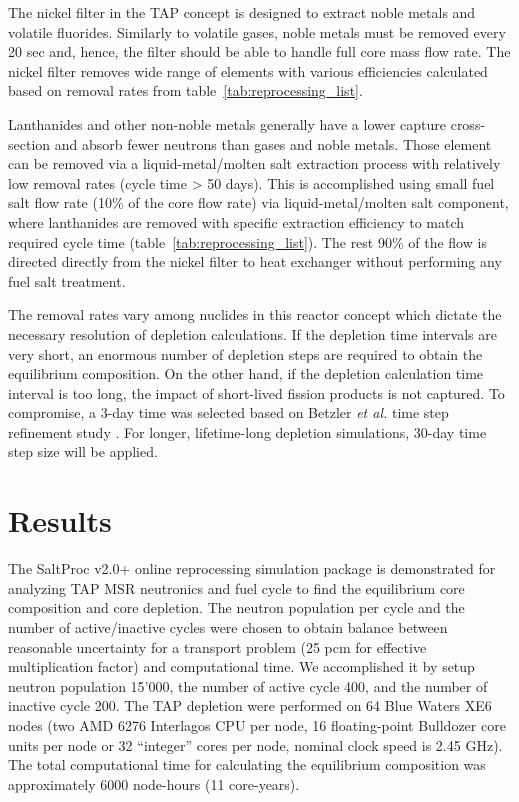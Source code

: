 \documentclass[12pt]{article} %
\begin{document}
The nickel filter in the \gls{TAP} concept is designed to extract noble metals and 
volatile fluorides. Similarly to volatile gases, noble metals must be removed 
every 20 sec and, hence, the filter should be able to handle full core mass 
flow rate. The nickel filter removes wide range of elements with various 
efficiencies calculated based on removal rates from table~\ref{tab:reprocessing_list}.

Lanthanides and other non-noble metals generally have a lower capture cross-section 
and absorb fewer neutrons than gases and noble metals. Those element can be removed 
via a liquid-metal/molten salt extraction process with relatively low removal rates 
(cycle time > 50 days). This is accomplished using small fuel salt flow rate (10\% 
of the core flow rate) via liquid-metal/molten salt component, where lanthanides are 
removed with specific extraction efficiency to match required cycle time (table~\ref{tab:reprocessing_list}). The rest 90\% of the flow is directed directly from the 
nickel filter to heat exchanger without performing any fuel salt treatment.

The removal rates vary among nuclides in this reactor concept which dictate the 
necessary resolution of depletion calculations. If the depletion time intervals 
are very short, an enormous number of depletion steps are required to obtain 
the equilibrium composition. On the other hand, if the depletion calculation time 
interval is too long, the impact of short-lived fission products is not captured. To compromise, a 3-day time was selected based on Betzler \emph{et al.} time step 
refinement study \cite{betzler_assessment_2017}. For longer, lifetime-long 
depletion simulations, 30-day time step size will be applied.

\section{Results}
The SaltProc v2.0+ online reprocessing simulation package is demonstrated for 
analyzing \gls{TAP} \gls{MSR} neutronics and fuel cycle to find the equilibrium core composition and core depletion. The neutron population per cycle and the number 
of active/inactive cycles were chosen to obtain balance between reasonable 
uncertainty for a transport problem (25 pcm for effective multiplication factor) 
and computational time. We accomplished it by setup neutron population 15'000, 
the number of active cycle 400, and the number of inactive cycle 200. 
The \gls{TAP} depletion were performed on 64 Blue Waters 
XE6 nodes (two AMD 6276 Interlagos CPU per node, 16 floating-point Bulldozer 
core units per node or 32 ``integer'' cores per node, nominal clock speed is 
2.45 GHz). The total computational time for calculating the equilibrium 
composition was approximately 6000 node-hours (11 core-years).
\end{document}
